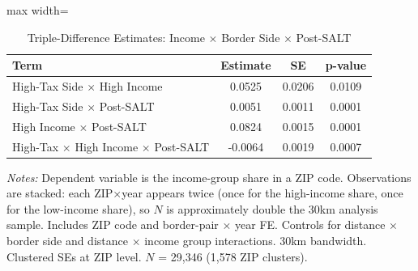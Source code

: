 \begin{table}[htbp]
\centering
\caption{Triple-Difference Estimates: Income $\times$ Border Side $\times$ Post-SALT}
\label{tab:ddd}
\begin{adjustbox}{max width=\textwidth}
\begin{tabular}{lccc}
  \hline
Term & Estimate & SE & p-value \\ 
  \hline
High-Tax Side $\times$ High Income &  0.0525 & 0.0206 & 0.0109 \\ 
  High-Tax Side $\times$ Post-SALT &  0.0051 & 0.0011 & 0.0001 \\ 
  High Income $\times$ Post-SALT &  0.0824 & 0.0015 & 0.0001 \\ 
  High-Tax $\times$ High Income $\times$ Post-SALT & -0.0064 & 0.0019 & 0.0007 \\ 
   \hline
\end{tabular}
\end{adjustbox}
\begin{tablenotes}\small
\item \textit{Notes:} Dependent variable is the income-group share in a ZIP code. Observations are stacked: each ZIP$\times$year appears twice (once for the high-income share, once for the low-income share), so $N$ is approximately double the 30km analysis sample. Includes ZIP code and border-pair $\times$ year FE. Controls for distance $\times$ border side and distance $\times$ income group interactions. 30km bandwidth. Clustered SEs at ZIP level. $N$ = 29,346 (1,578 ZIP clusters).
\end{tablenotes}
\end{table}
